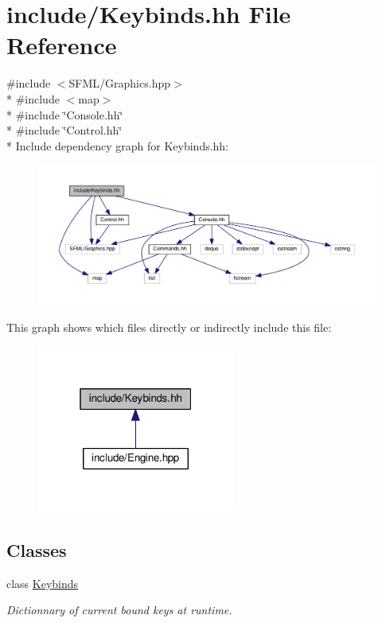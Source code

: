 \hypertarget{Keybinds_8hh}{}\section{include/\+Keybinds.hh File Reference}
\label{Keybinds_8hh}
{\ttfamily \#include $<$S\+F\+M\+L/\+Graphics.\+hpp$>$}\\*
{\ttfamily \#include $<$map$>$}\\*
{\ttfamily \#include \char`\"{}Console.\+hh\char`\"{}}\\*
{\ttfamily \#include \char`\"{}Control.\+hh\char`\"{}}\\*
Include dependency graph for Keybinds.\+hh\+:\nopagebreak
\begin{figure}[H]
\begin{center}
\leavevmode
\includegraphics[width=350pt]{Keybinds_8hh__incl}
\end{center}
\end{figure}
This graph shows which files directly or indirectly include this file\+:\nopagebreak
\begin{figure}[H]
\begin{center}
\leavevmode
\includegraphics[width=184pt]{Keybinds_8hh__dep__incl}
\end{center}
\end{figure}
\subsection*{Classes}
\begin{DoxyCompactItemize}
\item 
class \hyperlink{classKeybinds}{Keybinds}
\begin{DoxyCompactList}\small\item\em Dictionnary of current bound keys at runtime. \end{DoxyCompactList}\end{DoxyCompactItemize}
